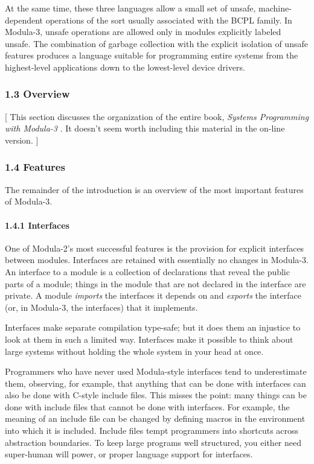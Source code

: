 \documentclass[10pt]{article}
\begin{document}
At the same time, these three languages allow a small set of unsafe,
machine-dependent operations of the sort usually associated with the BCPL
family.  In Modula-3, unsafe operations are allowed only in modules explicitly
labeled unsafe.  The combination of garbage collection with the explicit
isolation of unsafe features produces a language suitable for programming
entire systems from the highest-level applications down to the lowest-level
device drivers.

\subsubsection*{1.3 Overview}

[ This section discusses the organization of the entire book, \emph{Systems
  Programming with Modula-3} .  It doesn't seem worth including this material
in the on-line version. ]

\subsubsection*{1.4 Features}

The remainder of the introduction is an overview of the most important
features of Modula-3.

\paragraph{1.4.1 Interfaces}

One of Modula-2's most successful features is the provision for explicit
interfaces between modules.  Interfaces are retained with essentially no
changes in Modula-3.  An interface to a module is a collection of declarations
that reveal the public parts of a module; things in the module that are not
declared in the interface are private.  A module \emph{imports} the interfaces
it depends on and \emph{exports} the interface (or, in Modula-3, the
interfaces) that it implements.

Interfaces make separate compilation type-safe; but it does them an injustice
to look at them in such a limited way.  Interfaces make it possible to think
about large systems without holding the whole system in your head at once.

Programmers who have never used Modula-style interfaces tend to underestimate
them, observing, for example, that anything that can be done with interfaces
can also be done with C-style include files.  This misses the point: many
things can be done with include files that cannot be done with interfaces.  For
example, the meaning of an include file can be changed by defining macros in
the environment into which it is included.  Include files tempt programmers
into shortcuts across abstraction boundaries.  To keep large programs well
structured, you either need super-human will power, or proper language support
for interfaces.
\end{document}
